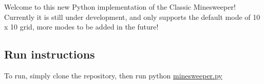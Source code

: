

 Welcome to this new Python implementation of the Classic Minesweeper! Currently it is still under development, and only supports the default mode of 10 x 10 grid, more modes to be added in the future!

\subsection*{Run instructions}



 To run, simply clone the repository, then run {\ttfamily python \mbox{\hyperlink{minesweeper_8py}{minesweeper.\+py}}} 